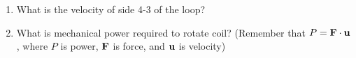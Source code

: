 \documentclass[../../header.tex]{subfiles}
\begin{document}
\begin{enumerate}
\item What is the velocity of side 4-3 of the loop?


\item What is mechanical power required to rotate coil? (Remember that $P  = \mathbf{F} \cdot \mathbf{u}$, where $P$ is power, $\mathbf{F}$ is force, and $\mathbf{u}$ is velocity)


\end{enumerate}
\end{document}

